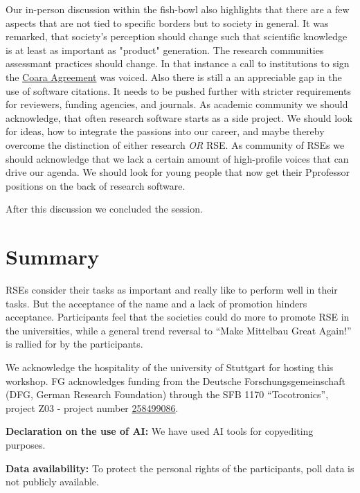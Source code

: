 \documentclass{eceasst}
\newcommand{\geprislink}[1]{\href{https://gepris.dfg.de/gepris/projekt/#1?language=en}{#1}}
\newenvironment{aiuse}{%
  \par\vspace{11pt}%
  \noindent\textbf{Declaration on the use of AI:}\enspace}{%
  \par\vspace{11pt}}
\newenvironment{data}{%
  \par\vspace{11pt}%
  \noindent\textbf{Data availability:}\enspace}{%
  \par\vspace{11pt}}
\begin{document}
Our in-person discussion within the fish-bowl also highlights that there are a few aspects that are not
tied to specific borders but to society in general.
It was remarked, that society's  perception should change such that
scientific knowledge is at least as important as "product" generation.
The research communities assessmant practices should change. In that instance a call to institutions to sign
the \href{https://www.coara.org/}{Coara Agreement} was voiced.
Also there is still a an appreciable gap in the use of software citations.
It needs to be pushed further with stricter requirements
for reviewers, funding agencies, and journals.
As academic community we should acknowledge, that often research software starts as a side project.
We should look for ideas, how to integrate the passions into our career,
and maybe thereby overcome the distinction of either research \emph{OR} RSE.
As community of RSEs we should acknowledge that we lack a certain amount of high-profile voices
that can drive our agenda. We should look for young people that now get their Pprofessor positions on the back of research software.

After this discussion we concluded the session.

\section{Summary}
RSEs consider their tasks as important and really like to perform well in their tasks. But the acceptance of the name and a lack
of promotion hinders acceptance. Participants feel that the societies could do more to promote RSE in the universities,
while a general trend reversal to ``Make Mittelbau Great Again!'' is rallied for by the participants.

\begin{acknowledge}
We acknowledge the hospitality of the university of Stuttgart for hosting this workshop.
FG acknowledges funding from the Deutsche Forschungsgemeinschaft (DFG, German Research Foundation) through the SFB 1170 “Tocotronics”, project Z03 - project number \geprislink{258499086}.
\end{acknowledge}

\begin{aiuse}
We have used AI tools for copyediting purposes.
\end{aiuse}

\begin{data}
To protect the personal rights of the participants, poll data is not publicly available.
\end{data}



\end{document}
